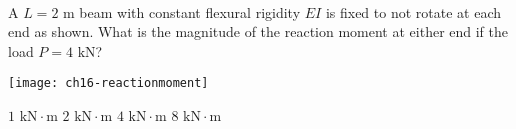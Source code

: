 \variant
\\
\begin{minipage}[t]{3in}
A $L=2\text{ m}$ beam with constant flexural rigidity $EI$ is fixed to not rotate at each end as shown. What is the magnitude of the reaction moment at either end if the load $P = 4\text{ kN}$?
\end{minipage}
\quad
\begin{minipage}[t]{3in}
\vspace{-12pt}
\texttt{[image: ch16-reactionmoment]}
\end{minipage}
\vspace{-24pt}
\begin{answers}
\correctanswer $1\text{ kN}\cdot\text{m}$
\answer $2\text{ kN}\cdot\text{m}$
\answer $4\text{ kN}\cdot\text{m}$
\answer $8\text{ kN}\cdot\text{m}$
\end{answers}
